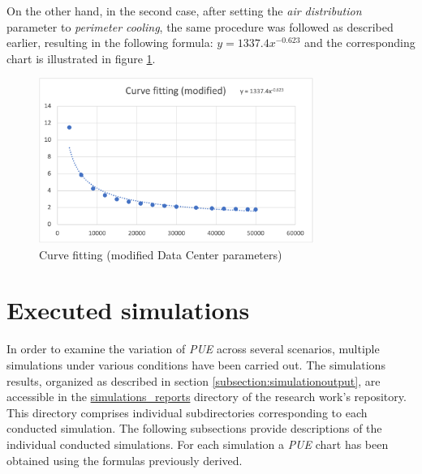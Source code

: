 On the other hand, in the second case, after setting the \emph{air distribution} parameter to \emph{perimeter cooling}, the same procedure was followed as described earlier, resulting in the following formula: \(y=1337.4x^{-0.623}\) and the corresponding chart is illustrated in figure \ref{fig:curve_fitting_modified}.
\begin{figure}[h]
    \centering
    \includegraphics[width=0.8\textwidth]{chapters/images/curve_fitting_modified.png}
    \caption{Curve fitting (modified Data Center parameters)}
    \label{fig:curve_fitting_modified}
\end{figure}

\section{Executed simulations}
In order to examine the variation of \emph{PUE} across several scenarios, multiple simulations under various conditions have been carried out. The simulations results, organized as described in section \ref{subsection:simulationoutput}, are accessible in the \href{https://github.com/vincenzo-emanuele/masters-degree-thesis/tree/main/simulation_reports}{simulations\_reports} directory of the research work's repository. This directory comprises individual subdirectories corresponding to each conducted simulation. The following subsections provide descriptions of the individual conducted simulations. For each simulation a \emph{PUE} chart has been obtained using the formulas previously derived. 


